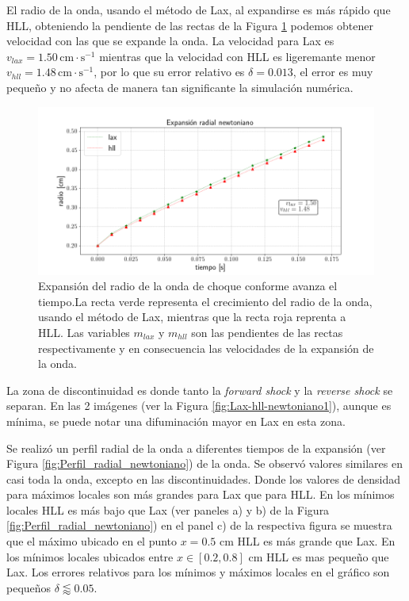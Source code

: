 \documentclass[12pt,a4paper]{book}
\begin{document}
El radio de la onda, usando el método de Lax, al expandirse es más rápido que HLL, obteniendo la pendiente de las rectas de la Figura \ref{fig:expansion_radial_newtoniano} podemos obtener velocidad con las que se expande la onda. La velocidad para Lax es $v_{lax} = 1.50 \, \mathrm{cm} \cdot \mathrm{s}^{-1}$ mientras que la velocidad con HLL es ligeremante menor $v_{hll} = 1.48  \, \mathrm{cm} \cdot \mathrm{s}^{-1}$, por lo que su error relativo es $\delta  = 0.013$, el error es muy pequeño y no afecta de manera tan significante la simulación numérica.

\begin{figure}
\centering
\includegraphics[width=1.0\textwidth]{./Figuras/Pruebas/expansion_radial/expansion_radial_newtoniano}
\caption{\label{fig:expansion_radial_newtoniano}Expansión del radio de la onda de choque conforme avanza el tiempo.La recta verde representa el crecimiento del radio de la onda, usando el método de Lax, mientras que la recta roja reprenta a HLL. Las variables $m_{lax}$ y $m_{hll}$ son las pendientes de las rectas respectivamente y en consecuencia las velocidades de la expansión de la onda.} 
\end{figure}

La zona de discontinuidad es donde tanto la \emph{forward shock} y la \emph{reverse shock} se separan. En las 2 imágenes (ver la Figura \ref{fig:Lax-hll-newtoniano1}), aunque es mínima, se puede notar una difuminación mayor en Lax en esta zona.

Se realizó un perfil radial de la onda a diferentes tiempos de la expansión (ver Figura \ref{fig:Perfil_radial_newtoniano}) de la onda. Se observó valores similares en casi toda la onda, excepto en las discontinuidades. Donde los valores de densidad para máximos locales son más grandes para Lax que para HLL. En los mínimos locales HLL es más bajo que Lax (ver paneles a) y b) de la Figura \ref{fig:Perfil_radial_newtoniano})
en el panel c) de la respectiva figura se muestra que el máximo ubicado en el punto $x  = 0.5$ cm HLL es más grande que Lax. En los mínimos locales ubicados entre $x \in [0.2, 0.8]$ cm  HLL es mas pequeño que Lax. Los errores relativos para los mínimos y máximos locales en el gráfico son pequeños $\delta \lessapprox 0.05$.
\end{document}

